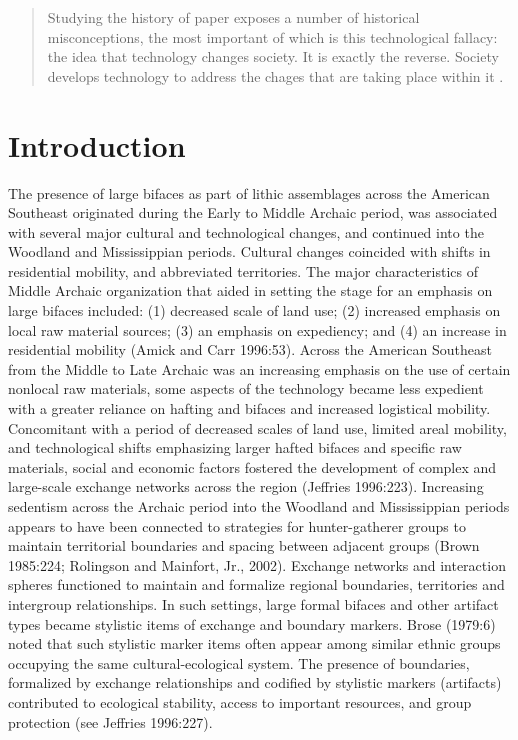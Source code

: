 \documentclass[]{interact}
\theoremstyle{plain}%
\theoremstyle{definition}
\theoremstyle{remark}
\begin{document}
\begin{quote}
Studying the history of paper exposes a number of historical
misconceptions, the most important of which is this technological
fallacy: the idea that technology changes society. It is exactly the
reverse. Society develops technology to address the chages that are
taking place within it \citep[xiv]{RN10878}.
\end{quote}

\hypertarget{introduction}{%
\section{Introduction}\label{introduction}}

The presence of large bifaces as part of lithic assemblages across the
American Southeast originated during the Early to Middle Archaic period,
was associated with several major cultural and technological changes,
and continued into the Woodland and Mississippian periods. Cultural
changes coincided with shifts in residential mobility, and abbreviated
territories. The major characteristics of Middle Archaic organization
that aided in setting the stage for an emphasis on large bifaces
included: (1) decreased scale of land use; (2) increased emphasis on
local raw material sources; (3) an emphasis on expediency; and (4) an
increase in residential mobility (Amick and Carr 1996:53). Across the
American Southeast from the Middle to Late Archaic was an increasing
emphasis on the use of certain nonlocal raw materials, some aspects of
the technology became less expedient with a greater reliance on hafting
and bifaces and increased logistical mobility. Concomitant with a period
of decreased scales of land use, limited areal mobility, and
technological shifts emphasizing larger hafted bifaces and specific raw
materials, social and economic factors fostered the development of
complex and large-scale exchange networks across the region (Jeffries
1996:223). Increasing sedentism across the Archaic period into the
Woodland and Mississippian periods appears to have been connected to
strategies for hunter-gatherer groups to maintain territorial boundaries
and spacing between adjacent groups (Brown 1985:224; Rolingson and
Mainfort, Jr., 2002). Exchange networks and interaction spheres
functioned to maintain and formalize regional boundaries, territories
and intergroup relationships. In such settings, large formal bifaces and
other artifact types became stylistic items of exchange and boundary
markers. Brose (1979:6) noted that such stylistic marker items often
appear among similar ethnic groups occupying the same
cultural-ecological system. The presence of boundaries, formalized by
exchange relationships and codified by stylistic markers (artifacts)
contributed to ecological stability, access to important resources, and
group protection (see Jeffries 1996:227).
\end{document}
